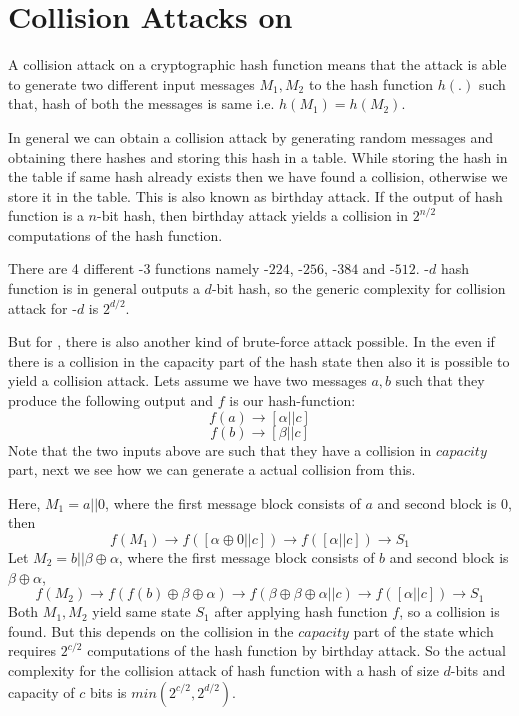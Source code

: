 \section{Collision Attacks on \KECCAK{}}

A collision attack on a cryptographic hash function means that the attack is able to generate two different input messages $M_1, M_2$ to the hash function $h(.)$ such that, hash of both the messages is same i.e. $h(M_1) = h(M_2)$.

In general we can obtain a collision attack by generating random messages and obtaining there hashes and storing this hash in a table. While storing the hash in the table if same hash already exists then we have found a collision, otherwise we store it in the table. This is also known as birthday attack. If the output of hash function is a $n$-bit hash, then birthday attack yields a collision in $2^{n/2}$ computations of the hash function.

There are 4 different \SHA-$3$ functions namely -$224$, -$256$, -$384$ and -$512$. -$d$ hash function is in general outputs a $d$-bit hash, so the generic complexity for collision attack for -$d$ is $2^{d/2}$.

But for \KECCAK{}, there is also another kind of brute-force attack possible. In the \KECCAK{} even if there is a collision in the capacity part of the hash state then also it is possible to yield a collision attack. Lets assume we have two messages $a, b$ such that they produce the following output and $f$ is our hash-function:
\[
	f(a) \rightarrow \left[ \alpha || c \right]
\]
\[
	f(b) \rightarrow \left[ \beta || c \right]
\]
Note that the two inputs above are such that they have a collision in $capacity$ part, next we see how we can generate a actual collision from this.

Here, $M_1 = a || 0$, where the first message block consists of $a$ and second block is $0$, then
\[
	f(M_1) \rightarrow f\left( \left[ \alpha \oplus 0 || c \right] \right) \rightarrow f\left( \left[ \alpha || c \right] \right) \rightarrow S_1
\]
Let $M_2 = b || \beta \oplus \alpha$, where the first message block consists of $b$ and second block is $\beta \oplus \alpha$, 
\[
	f(M_2) \rightarrow f\left( f(b) \oplus \beta \oplus \alpha \right) \rightarrow f\left( \beta \oplus \beta \oplus \alpha || c \right) \rightarrow f\left( \left[\alpha || c\right] \right) \rightarrow S_1
\]
Both $M_1, M_2$ yield same state $S_1$ after applying hash function $f$, so a collision is found. But this depends on the collision in the $capacity$ part of the state which requires $2^{c/2}$ computations of the hash function by birthday attack. So the actual complexity for the collision attack of \KECCAK{} hash function with a hash of size $d$-bits and capacity of $c$ bits is $min\left( 2^{c/2}, 2^{d/2}\right)$.

